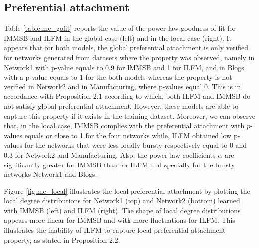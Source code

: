 \subsection{Preferential attachment}

Table \ref{table:me_gofit} reports the value of the power-law goodness of fit for IMMSB and ILFM in the global case (left) and in the local case (right). It appears that for both models, the global preferential attachment is only verified for networks generated from datasets where the property was observed, namely in Network1 with p-value equals to 0.9 for IMMSB and 1 for ILFM, and in Blogs with a p-value equals to 1 for the both models whereas the property is not verified in Network2 and in Manufacturing, where p-values equal 0. This is in accordance with Proposition 2.1 according to which, both ILFM and IMMSB do not satisfy global preferential attachment. However, these models are able to capture this property if it exists in the training dataset.  Moreover, we can observe that, in the local case, IMMSB complies with the preferential attachment with $p$-values equals or close to 1 for the four networks while, ILFM obtained low p-values for the networks that were less locally bursty respectively equal to 0 and 0.3 for Network2 and Manufacturing. Also, the power-law coefficients $\alpha$ are significantly greater for IMMSB than for ILFM and specially for the bursty networks Network1 and Blogs.

Figure \ref{fig:me_local} illustrates the local preferential attachment by plotting the local degree distributions for Network1 (top) and Network2 (bottom) learned with IMMSB (left) and ILFM (right). The shape of local degree distributions appears more linear for IMMSB and with more fluctuations for ILFM. This illustrates the inability  of ILFM to capture local preferential attachment property,  as stated in Proposition 2.2. 

